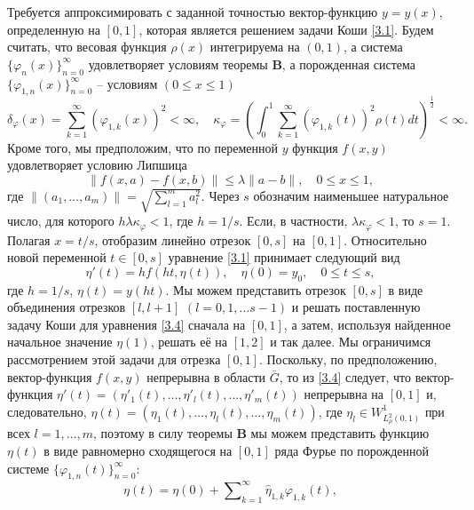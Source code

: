 Требуется аппроксимировать с заданной точностью вектор-функцию $y=y(x)$, определенную на $[0,1]$, которая является решением задачи Коши \eqref{3.1}.
Будем считать, что весовая функция $\rho(x)$ интегрируема на $(0,1)$, а система $\{\varphi_{n}(x)\}_{n=0}^\infty$ удовлетворяет условиям теоремы \textbf{ B}, а порожденная система $\{\varphi_{1,n}(x)\}_{n=0}^\infty$ -- условиям $(0\le x\le 1)$
\begin{equation}\label{3.2}
\delta_\varphi(x)=\sum_{k=1}^{\infty}(\varphi_{1,k}(x))^2<\infty,\quad
\kappa_{\varphi}=\left(\int_0^1\sum_{k=1}^{\infty}
(\varphi_{1,k}(t))^2\rho(t)dt\right)^{\frac12}<\infty.
\end{equation}
Кроме того, мы предположим, что по переменной $y$ функция $f(x,y)$ удовлетворяет условию Липшица
 \begin{equation}\label{3.3}
\|f(x,a)-f(x,b)\|\le \lambda\|a-b\|, \quad 0\le x \le 1,
\end{equation}
где $\|(a_1,\ldots,a_m)\|=\sqrt{\sum_{l=1}^ma_l^2}$. Через $s$ обозначим наименьшее натуральное число, для которого $h\lambda\kappa_\varphi<1$, где $h=1/s$. Если, в частности, $\lambda\kappa_\varphi<1$, то $s=1$. Полагая $x=t/s$, отобразим линейно отрезок $[0,s]$ на $[0,1]$. Относительно новой переменной $t\in [0,s]$ уравнение \eqref{3.1} принимает следующий вид
\begin{equation}\label{3.4}
\eta'(t)=hf(ht,\eta(t)), \quad \eta(0)=y_0,\quad 0\le t\le s,
\end{equation}
где $h=1/s$, $\eta(t)=y(ht)$. Мы можем представить отрезок $[0,s]$ в виде объединения отрезков $[l,l+1]$ $(l=0,1,\ldots s-1)$ и  решать поставленную задачу Коши для уравнения \eqref{3.4} сначала на $[0,1]$, а затем, используя найденное начальное значение $\eta(1)$,  решать её на $[1,2]$ и так далее. Мы ограничимся рассмотрением этой задачи для отрезка $[0,1]$. Поскольку, по предположению, вектор-функция $f(x,y)$ непрерывна в области $\bar G$, то из \eqref{3.4} следует, что  вектор-функция $\eta'(t)=(\eta'_1(t),\ldots,\eta'_l(t),\ldots,\eta'_m(t))$ непрерывна на $[0,1]$ и, следовательно, $\eta(t)=(\eta_1(t),\ldots,\eta_l(t),\ldots,\eta_m(t))$, где $\eta_l\in W_{L_\rho^2(0,1)}^1$ при всех $l=1,\ldots,m$, поэтому в силу теоремы \textbf{ B}  мы можем представить  функцию $\eta(t)$ в виде равномерно сходящегося на $[0,1]$ ряда Фурье по порожденной системе $\{\varphi_{1,n}(t)\}_{n=0}^\infty$:
\begin{equation}\label{3.5}
\eta(t)= \eta(0)+ \sum\nolimits_{k=1}^\infty \hat \eta_{1,k}\varphi_{1,k}(t),
\end{equation}
